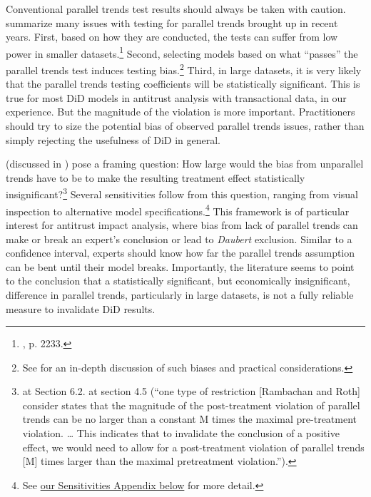 \documentclass[12pt]{article}
\begin{document}
Conventional parallel trends test results should always be taken with caution. \citet{roth2023s} summarize many issues with testing for parallel trends brought up in recent years. First, based on how they are conducted, the tests can suffer from low power in smaller datasets.\footnote{\citet{roth2023s}, p. 2233.}  Second, selecting models based on what “passes” the parallel trends test induces testing bias.\footnote{See \citet{roth2022a} for an in-depth discussion of such biases and practical considerations.}  Third, in large datasets, it is very likely that the parallel trends testing coefficients will be statistically significant. This is true for most DiD models in antitrust analysis with transactional data, in our experience. But the magnitude of the violation is more important. Practitioners should try to size the potential bias of observed parallel trends issues, rather than simply rejecting the usefulness of DiD in general. 

\citet{rambachan2023more} (discussed in \citet{roth2023s}) pose a framing question: How large would the bias from unparallel trends have to be to make the resulting treatment effect statistically insignificant?\footnote{\citet{rambachan2023more} at Section 6.2. \citet{roth2023s} at section 4.5 (“one type of restriction [Rambachan and Roth] consider states that the magnitude of the post-treatment violation of parallel trends can be no larger than a constant M times the maximal pre-treatment violation. … This indicates that to invalidate the conclusion of a positive effect, we would need to allow for a post-treatment violation of parallel trends [M] times larger than the maximal pretreatment violation.”).}  Several sensitivities follow from this question, ranging from visual inspection to alternative model specifications.\footnote{See \hyperref[sec:appendixa]{our Sensitivities Appendix below} for more detail.}  This framework is of particular interest for antitrust impact analysis, where bias from lack of parallel trends can make or break an expert’s conclusion or lead to \textit{Daubert} exclusion. Similar to a confidence interval, experts should know how far the parallel trends assumption can be bent until their model breaks. Importantly, the literature seems to point to the conclusion that a statistically significant, but economically insignificant, difference in parallel trends, particularly in large datasets, is not a fully reliable measure to invalidate DiD results.
\end{document}
